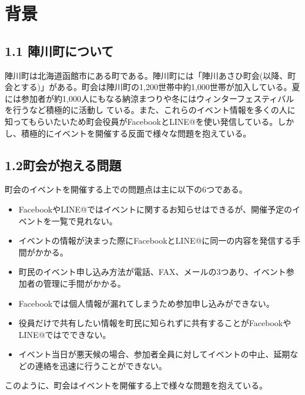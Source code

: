 \chapter{背景}

\section{1.1 陣川町について}
陣川町は北海道函館市にある町である。陣川町には「陣川あさひ町会(以降、町会とする)」がある。町会は陣川町の1,200世帯中約1,000世帯が加入している。夏には参加者が約1,000人にもなる納涼まつりや冬にはウィンターフェスティバルを行うなど積極的に活動し
ている。また、これらのイベント情報を多くの人に知ってもらいたいため町会役員がFacebookとLINE@を使い発信している。しかし、積極的にイベントを開催する反面で様々な問題を抱えている。

\section{1.2町会が抱える問題}
町会のイベントを開催する上での問題点は主に以下の6つである。
\begin{itemize}
    \item FacebookやLINE@ではイベントに関するお知らせはできるが、開催予定のイベントを一覧で見れない。
    \item イベントの情報が決まった際にFacebookとLINE@に同一の内容を発信する手間がかかる。
    \item 町民のイベント申し込み方法が電話、FAX、メールの3つあり、イベント参加者の管理に手間がかかる。
    \item Facebookでは個人情報が漏れてしまうため参加申し込みができない。
    \item 役員だけで共有したい情報を町民に知られずに共有することがFacebookやLINE@ではでできない。
    \item イベント当日が悪天候の場合、参加者全員に対してイベントの中止、延期などの連絡を迅速に行うことができない。
\end{itemize}
このように、町会はイベントを開催する上で様々な問題を抱えている。
